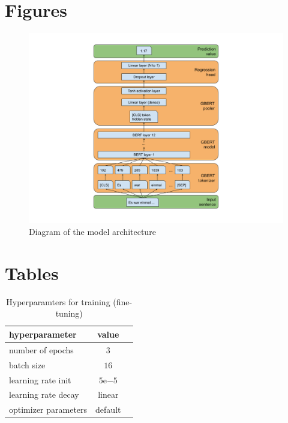 \documentclass[11pt, DIV12]{scrartcl}
\begin{document}
\newpage


\newpage
\begin{appendices}

\section{Figures}
\label{appendix:figures}

\begin{figure}[h]
\includegraphics[width=\linewidth]{bert_regressor.png}
\caption{Diagram of the model architecture}
\label{fig:diag_model}
\end{figure}


\section{Tables}
\label{appendix:tables}

\begin{table}[h]
\center
  \begin{tabular}{l|cc}
    hyperparameter & value & \\
    \hline
    number of epochs & \(3\) & \\
    batch size & \(16\) & \\
    learning rate init & \(5\mathrm{e}{-5}\) & \\
    learning rate decay & linear & \\
    optimizer parameters & default &
  \end{tabular}
  \caption{Hyperparamters for training (fine-tuning)}
  \label{tab:train_hyperparams}
\end{table}

\end{appendices}
\end{document}
